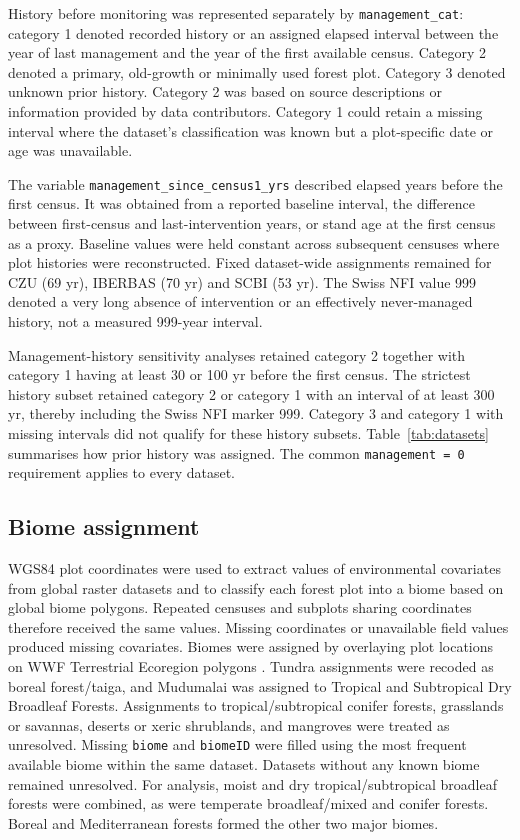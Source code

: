 \documentclass{myreport}
\begin{document}
History before monitoring was represented separately by \texttt{management\_cat}: category 1 denoted recorded history or an assigned elapsed interval between the year of last management and the year of the first available census. Category 2 denoted a primary, old-growth or minimally used forest plot. Category 3 denoted unknown prior history. Category 2 was based on source descriptions or information provided by data contributors. Category 1 could retain a missing interval where the dataset's classification was known but a plot-specific date or age was unavailable.

The variable \texttt{management\_since\_census1\_yrs} described elapsed years before the first census. It was obtained from a reported baseline interval, the difference between first-census and last-intervention years, or stand age at the first census as a proxy. Baseline values were held constant across subsequent censuses where plot histories were reconstructed. Fixed dataset-wide assignments remained for CZU (69 yr), IBERBAS (70 yr) and SCBI (53 yr). The Swiss NFI value 999 denoted a very long absence of intervention or an effectively never-managed history, not a measured 999-year interval.

Management-history sensitivity analyses retained category 2 together with category 1 having at least 30 or 100 yr before the first census. The strictest history subset retained category 2 or category 1 with an interval of at least 300 yr, thereby including the Swiss NFI marker 999. Category 3 and category 1 with missing intervals did not qualify for these history subsets. Table~\ref{tab:datasets} summarises how prior history was assigned. The common \texttt{management = 0} requirement applies to every dataset.

\subsection{Biome assignment}
\label{sec:environmentalextraction}

WGS84 plot coordinates were used to extract values of environmental covariates from global raster datasets and to classify each forest plot into a biome based on global biome polygons. Repeated censuses and subplots sharing coordinates therefore received the same values. Missing coordinates or unavailable field values produced missing covariates. Biomes were assigned by overlaying plot locations on WWF Terrestrial Ecoregion polygons \citep{olson01wwf}. Tundra assignments were recoded as boreal forest/taiga, and Mudumalai was assigned to Tropical and Subtropical Dry Broadleaf Forests. Assignments to tropical/subtropical conifer forests, grasslands or savannas, deserts or xeric shrublands, and mangroves were treated as unresolved. Missing \texttt{biome} and \texttt{biomeID} were filled using the most frequent available biome within the same dataset. Datasets without any known biome remained unresolved. For analysis, moist and dry tropical/subtropical broadleaf forests were combined, as were temperate broadleaf/mixed and conifer forests. Boreal and Mediterranean forests formed the other two major biomes.
\end{document}
